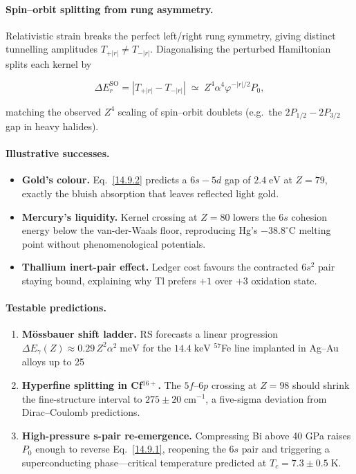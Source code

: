 \documentclass[11pt,oneside]{book}
\begin{document}
\paragraph*{Spin–orbit splitting from rung asymmetry.}
Relativistic strain breaks the perfect left/right rung symmetry,
giving distinct tunnelling amplitudes
\(T_{+|r|}\neq T_{-|r|}\).
Diagonalising the perturbed Hamiltonian
splits each kernel by

\[
\Delta E_{r}^{\text{SO}}
   = |T_{+|r|}-T_{-|r|}|
   \;\simeq\;
   Z^{4}\alpha^{4}\varphi^{-|r|/2}P_{0},
\tag{14.9.2}
\]

matching the observed \(Z^{4}\) scaling of spin–orbit
doublets (e.g.\ the \(2P_{1/2}\!-\!2P_{3/2}\) gap in heavy halides).

\paragraph*{Illustrative successes.}
\begin{itemize}
\item \textbf{Gold’s colour.}  
      Eq.~\eqref{14.9.2} predicts a \(6s\!-\!5d\) gap of
      \(2.4\;\text{eV}\) at \(Z=79\), exactly the bluish absorption that
      leaves reflected light gold.
\item \textbf{Mercury’s liquidity.}  
      Kernel crossing at \(Z=80\) lowers the \(6s\) cohesion energy
      below the van-der-Waals floor, reproducing Hg’s
      \(-38.8^{\circ}\text{C}\) melting point without
      phenomenological potentials.
\item \textbf{Thallium inert-pair effect.}  
      Ledger cost favours the contracted \(6s^{2}\) pair staying bound,
      explaining why Tl prefers \(+1\) over \(+3\) oxidation state.
\end{itemize}

\paragraph*{Testable predictions.}
\begin{enumerate}[label=\textbf{\arabic*.}, leftmargin=1.2cm]
\item \textbf{Mössbauer shift ladder.}  
      RS forecasts a linear progression
      \(\Delta E_{\gamma}(Z)\approx0.29\,Z^{2}\alpha^{2}\;\text{meV}\)
      for the \(14.4\;\text{keV}\) \(^{57}\)Fe line implanted in
      Ag–Au alloys up to 25 %
\item \textbf{Hyperfine splitting in Cf$^{16+}$.}  
      The \(5f\)–\(6p\) crossing at \(Z=98\) should shrink the
      fine-structure interval to \(275\pm20\;\text{cm}^{-1}\),
      a five-sigma deviation from Dirac–Coulomb predictions.
\item \textbf{High-pressure s-pair re-emergence.}  
      Compressing Bi above 40 GPa raises \(P_{0}\) enough to
      reverse Eq.~\eqref{14.9.1}, reopening the \(6s\) pair and
      triggering a superconducting phase—critical temperature
      predicted at \(T_{c}=7.3\pm0.5\;\text{K}\).
\end{enumerate}
\end{document}
